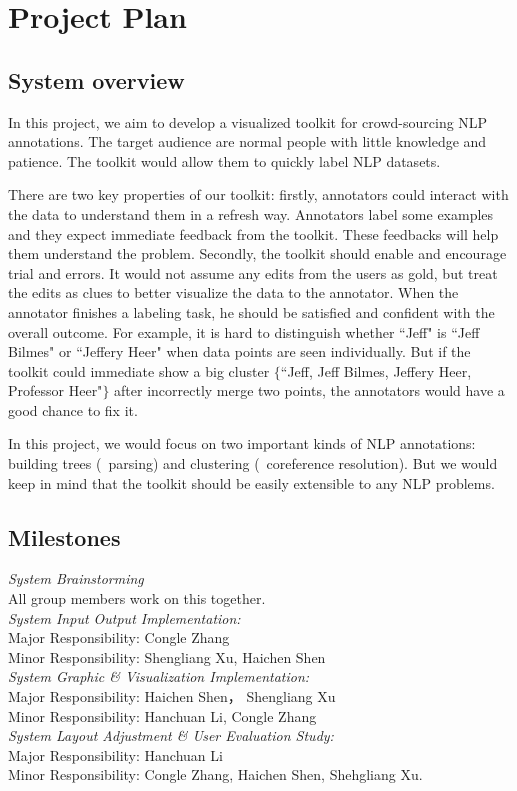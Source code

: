 \section{Project Plan}
\subsection{System overview}
In this project, we aim to develop a visualized toolkit for
crowd-sourcing NLP annotations. The target audience are normal people
with little knowledge and patience. The toolkit would allow them to
quickly label NLP datasets.

There are two key properties of our toolkit: firstly, annotators could
interact with the data to understand them in a refresh way. Annotators
label some examples and they expect immediate feedback from the
toolkit. These feedbacks will help them understand the problem.
Secondly, the toolkit should enable and encourage trial and errors. It
would not assume any edits from the users as gold, but treat the edits
as clues to better visualize the data to the annotator. When the
annotator finishes a labeling task, he should be satisfied and
confident with the overall outcome. For example, it is hard to
distinguish whether ``Jeff" is ``Jeff Bilmes" or ``Jeffery Heer" when
data points are seen individually. But if the toolkit could immediate
show a big cluster $\{$``Jeff, Jeff Bilmes, Jeffery Heer, Professor
Heer"$\}$ after incorrectly merge two points, the annotators would
have a good chance to fix it.

In this project, we would focus on two important kinds of NLP
annotations: building trees (\eg\  parsing) and clustering (\eg\
coreference resolution). But we would keep in mind that the toolkit
should be easily extensible to any NLP problems. 
\subsection{Milestones}

\emph{System Brainstorming}
\\All group members work on this together.
\\[1\baselineskip]
\emph{System Input Output Implementation:}\\Major Responsibility: Congle Zhang \\Minor Responsibility: Shengliang Xu, Haichen Shen
\\[1\baselineskip]
\emph{System Graphic \& Visualization Implementation:} \\Major Responsibility: Haichen Shen， Shengliang Xu \\Minor Responsibility: Hanchuan Li, Congle Zhang 
\\[1\baselineskip]
\emph{System Layout Adjustment \& User Evaluation Study:} \\Major Responsibility: Hanchuan Li \\ Minor Responsibility: Congle Zhang, Haichen Shen, Shehgliang Xu.
